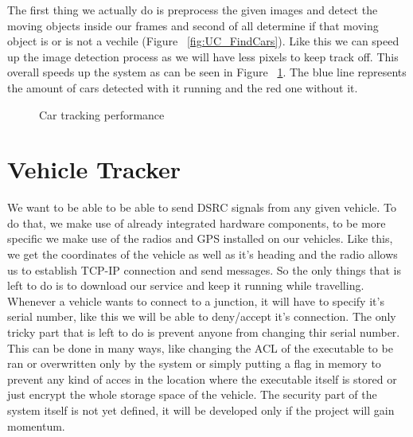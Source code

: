 \documentclass[17pt]{report}
\begin{document}
\pagebreak
The first thing we actually do is preprocess the given images and 
detect the moving objects inside our frames and second of all
determine if that moving object is or is not a vechile (Figure ~\ref{fig:UC_FindCars}).
Like this we can speed up the image detection process as we will have less pixels
to keep track off. This overall speeds up the system as can be seen in
Figure ~\ref{fig:Comparison}. The blue line represents the amount of cars 
detected with it running and the red one without it.
\begin{figure}[h!]
    \centering
    \label{fig:Comparison}
    \caption{Car tracking performance}
\end{figure}

\section{Vehicle Tracker}
\indent \indent
We want to be able to be able to send DSRC signals from any given vehicle.
To do that, we make use of already integrated hardware components, to be more
specific we make use of the radios and GPS installed on our vehicles. Like this,
we get the coordinates of the vehicle as well as it's heading and the radio
allows us to establish TCP-IP connection and send messages. So the only things
that is left to do is to download our service and keep it running while travelling.\\
\indent \indent
Whenever a vehicle wants to connect to a junction, it will have to specify it's 
serial number, like this we will be able to deny/accept it's connection. The only 
tricky part that is left to do is prevent anyone from changing thir serial number.
This can be done in many ways, like changing the ACL of the executable to be 
ran or overwritten only by the system or simply putting a flag in memory to 
prevent any kind of acces in the location where the executable itself is stored or 
just encrypt the whole storage space of the vehicle. The security part of the
system itself is not yet defined, it will be developed only if the project will gain momentum.
\pagebreak
\end{document}
